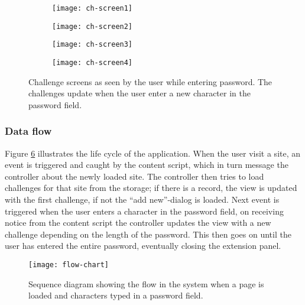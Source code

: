 \begin{figure}
    \centering
    \begin{subfigure}[t]{0.45\textwidth}
        \centering
        \texttt{[image: ch-screen1]} 
        \caption{}
        \label{challenge-screen1}
    \end{subfigure}
    \hfill
    \begin{subfigure}[t]{0.45\textwidth}
        \centering
        \texttt{[image: ch-screen2]} 
        \caption{}
        \label{challenge-screen2}
    \end{subfigure}
    \hfill
    \begin{subfigure}[t]{0.45\textwidth}
        \centering
        \texttt{[image: ch-screen3]} 
        \caption{}
        \label{challenge-screen3}
    \end{subfigure}
    \hfill
    \begin{subfigure}[t]{0.45\textwidth}
        \centering
        \texttt{[image: ch-screen4]} 
        \caption{}
        \label{challenge-screen4}
    \end{subfigure}
    \caption{Challenge screens as seen by the user while entering password. The challenges update when the user enter a new character in the password field.}
    \label{ch-screens}
\end{figure}



\subsubsection{Data flow}\label{data-flow}
Figure \ref{flow-chart} illustrates the life cycle of the application. When the user visit a site, an event is triggered and caught by the content script, which in turn message the controller about the newly loaded site. The controller then tries to load challenges for that site from the storage; if there is a record, the view is updated with the first challenge, if not the ``add new''-dialog is loaded. Next event is triggered when the user enters a character in the password field, on receiving notice from the content script the controller updates the view with a new challenge depending on the length of the password. This then goes on until the user has entered the entire password, eventually closing the extension panel.
\begin{figure}
    \centering
    \texttt{[image: flow-chart]} 
    \caption{Sequence diagram showing the flow in the system when a page is loaded and characters typed in a password field.}
    \label{flow-chart}
\end{figure}

